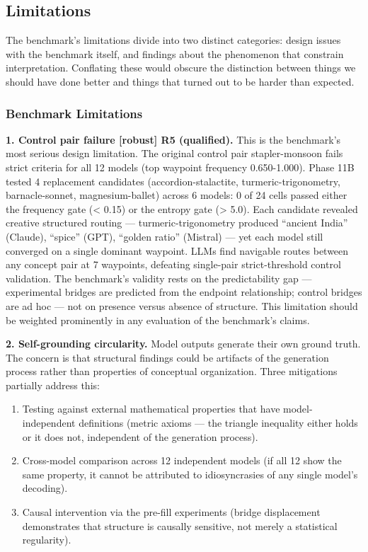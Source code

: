\subsection{Limitations}\label{limitations}

The benchmark's limitations divide into two distinct categories: design issues with the benchmark itself, and findings about the phenomenon that constrain interpretation. Conflating these would obscure the distinction between things we should have done better and things that turned out to be harder than expected.

\subsubsection{Benchmark Limitations}\label{benchmark-limitations}

\textbf{1. Control pair failure {[}robust{]} R5 (qualified).} This is the benchmark's most serious design limitation. The original control pair stapler-monsoon fails strict criteria for all 12 models (top waypoint frequency 0.650-1.000). Phase 11B tested 4 replacement candidates (accordion-stalactite, turmeric-trigonometry, barnacle-sonnet, magnesium-ballet) across 6 models: 0 of 24 cells passed either the frequency gate (\textless{} 0.15) or the entropy gate (\textgreater{} 5.0). Each candidate revealed creative structured routing --- turmeric-trigonometry produced ``ancient India'' (Claude), ``spice'' (GPT), ``golden ratio'' (Mistral) --- yet each model still converged on a single dominant waypoint. LLMs find navigable routes between any concept pair at 7 waypoints, defeating single-pair strict-threshold control validation. The benchmark's validity rests on the predictability gap --- experimental bridges are predicted from the endpoint relationship; control bridges are ad hoc --- not on presence versus absence of structure. This limitation should be weighted prominently in any evaluation of the benchmark's claims.

\textbf{2. Self-grounding circularity.} Model outputs generate their own ground truth. The concern is that structural findings could be artifacts of the generation process rather than properties of conceptual organization. Three mitigations partially address this:

\begin{enumerate}
\def\labelenumi{(\alph{enumi})}
\tightlist
\item
  Testing against external mathematical properties that have model-independent definitions (metric axioms --- the triangle inequality either holds or it does not, independent of the generation process).
\item
  Cross-model comparison across 12 independent models (if all 12 show the same property, it cannot be attributed to idiosyncrasies of any single model's decoding).
\item
  Causal intervention via the pre-fill experiments (bridge displacement demonstrates that structure is causally sensitive, not merely a statistical regularity).
\end{enumerate}

